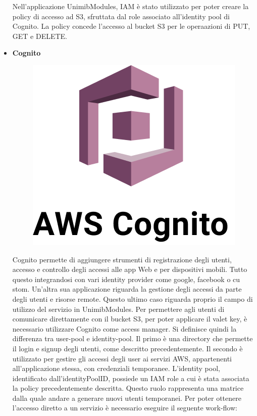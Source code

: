 \documentclass[12pt]{article}
\begin{document}
\begin{itemize}
\begin{figure}[H]
\end{figure}
Nell'applicazione UnimibModules, IAM è stato utilizzato per poter creare la policy di accesso ad S3, sfruttata dal role associato all'identity pool di Cognito. La policy concede l'accesso al bucket S3 per le operaazioni di PUT, GET e DELETE.
\item \textbf{Cognito}
\begin{figure}[H]
\includegraphics[scale=0.2, left]{cognito.png}
\end{figure}
Cognito permette di aggiungere strumenti di registrazione degli utenti, accesso e controllo degli accessi alle app Web e per dispositivi mobili. Tutto questo integrandosi con vari identity provider come google, facebook o cu
stom. Un'altra sua applicazione riguarda la gestione degli accessi da parte degli utenti e risorse remote. Questo ultimo caso riguarda proprio il campo di utilizzo del servizio in UnimibModules. Per permettere agli utenti di comunicare direttamente con il bucket S3, per poter applicare il valet key, è necessario utilizzare Cognito come access manager. Si definisce quindi la differenza tra user-pool e identity-pool. Il primo è una directory che permette il login e signup degli utenti, come descritto precedentemente. Il secondo è utilizzato per gestire gli accessi  degli user  ai servizi AWS, appartenenti all'applicazione stessa, con credenziali temporanee. L'identity pool, identificato dall'identityPoolID, possiede un IAM role a cui è stata associata la policy precedentemente descritta. Questo ruolo rappresenta una matrice dalla quale andare a generare nuovi utenti temporanei. Per poter ottenere l'accesso diretto a un servizio è necessario eseguire il seguente work-flow:

\end{itemize}
\end{document}
